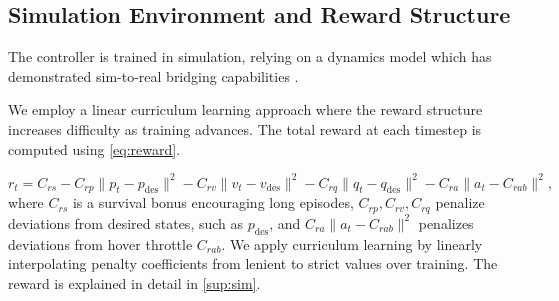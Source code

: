 \subsection{Simulation Environment and Reward Structure}
The controller is trained in simulation, relying on a dynamics model which has demonstrated sim-to-real bridging capabilities \cite{Eschmann2023}. 

We employ a linear curriculum learning approach where the reward structure increases difficulty as training advances. The total reward at each timestep is computed using \autoref{eq:reward}.

\begin{equation}\label{eq:reward}
    r_t = C_{rs} - C_{rp}\|p_t - p_{\text{des}}\|^2 - C_{rv}\|v_t - v_{\text{des}}\|^2 - C_{rq}\|q_t - q_{\text{des}}\|^2 - C_{ra}\|a_t- C_{rab}\|^2, 
\end{equation}
where $C_{rs}$ is a survival bonus encouraging long episodes, $C_{rp}, C_{rv}, C_{rq}$ penalize deviations from desired 
states, such as $p_{\text{des}}$, and $C_{ra}\|a_t - C_{rab}\|^2$ penalizes deviations from hover throttle 
$C_{rab}$. We apply curriculum learning by linearly interpolating penalty 
coefficients from lenient to strict values over training. The reward is explained in detail in \autoref{sup:sim}.





